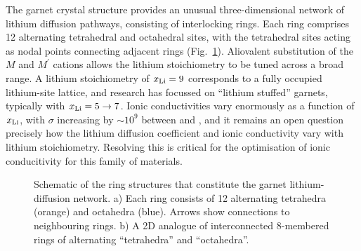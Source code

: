 \documentclass[aps,prb,twocolumn,superscriptaddress,reprint]{revtex4-1}
\newcommand{\xLi}{x_\m{Li}}
\begin{document}
The garnet crystal structure provides an unusual three-dimensional network of lithium diffusion pathways, consisting of interlocking rings.\cite{AwakaEtAl_ChemLett2011} Each ring comprises 12 alternating tetrahedral and octahedral sites, with the tetrahedral sites acting as nodal points connecting adjacent rings (Fig.~\ref{fig:garnet_network_schematic}). 
Aliovalent substitution of the $M$ and $M^\prime$ cations allows the lithium stoichiometry to be tuned across a broad range. 
A lithium stoichiometry of $\xLi=9$ corresponds to a fully occupied lithium-site lattice, and research has focussed on ``lithium stuffed'' garnets, typically with $\xLi=5\to7$. 
Ionic conductivities vary enormously as a function of $\xLi$, with $\sigma$ increasing by $\sim10^9$ between  and ,\cite{ThangaduraiEtAl_JPhysChemLett2015, BachmanEtAl_ChemRev2016} and it remains an open question precisely how the lithium diffusion coefficient and ionic conductivity vary with lithium stoichiometry. 
Resolving this is critical for the optimisation of ionic conducitivity for this family of materials.

\begin{figure}[tb]
  \centering
    \caption{\label{fig:garnet_network_schematic}Schematic of the ring structures that constitute the garnet lithium-diffusion network. a) Each ring consists of 12 alternating tetrahedra (orange) and octahedra (blue). 
Arrows show connections to neighbouring rings.\cite{AwakaEtAl_ChemLett2011} b) A 2D analogue of interconnected 8-membered rings of alternating ``tetrahedra'' and ``octahedra''.}
\end{figure}
\end{document}
